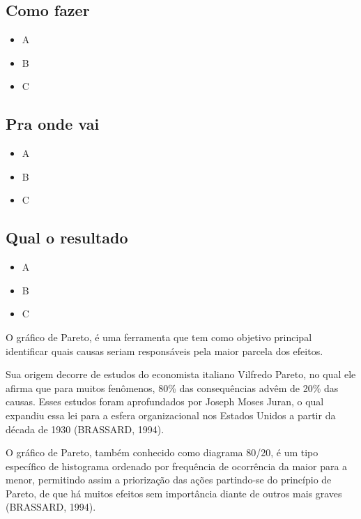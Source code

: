 \documentclass[
]{article}
\providecommand{\tightlist}{%
  \setlength{\itemsep}{0pt}\setlength{\parskip}{0pt}}
\begin{document}
\hypertarget{como-fazer-2}{%
\subsection*{Como fazer}\label{como-fazer-2}}

\begin{itemize}
\tightlist
\item
  A
\item
  B
\item
  C
\end{itemize}

\hypertarget{pra-onde-vai-2}{%
\subsection*{Pra onde vai}\label{pra-onde-vai-2}}

\begin{itemize}
\tightlist
\item
  A
\item
  B
\item
  C
\end{itemize}

\hypertarget{qual-o-resultado-2}{%
\subsection*{Qual o resultado}\label{qual-o-resultado-2}}

\begin{itemize}
\tightlist
\item
  A
\item
  B
\item
  C
\end{itemize}

O gráfico de Pareto, é uma ferramenta que tem como objetivo principal identificar quais causas seriam responsáveis pela maior parcela dos efeitos.

Sua origem decorre de estudos do economista italiano Vilfredo Pareto, no qual ele afirma que para muitos fenômenos, 80\% das consequências advêm de 20\% das causas. Esses estudos foram aprofundados por Joseph Moses Juran, o qual expandiu essa lei para a esfera organizacional nos Estados Unidos a partir da década de 1930 (BRASSARD, 1994).

O gráfico de Pareto, também conhecido como diagrama 80/20, é um tipo específico de histograma ordenado por frequência de ocorrência da maior para a menor, permitindo assim a priorização das ações partindo-se do princípio de Pareto, de que há muitos efeitos sem importância diante de outros mais graves (BRASSARD, 1994).
\end{document}
